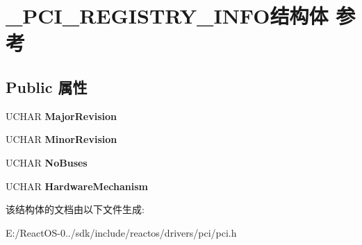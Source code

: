 \hypertarget{struct___p_c_i___r_e_g_i_s_t_r_y___i_n_f_o}{}\section{\+\_\+\+P\+C\+I\+\_\+\+R\+E\+G\+I\+S\+T\+R\+Y\+\_\+\+I\+N\+F\+O结构体 参考}
\label{struct___p_c_i___r_e_g_i_s_t_r_y___i_n_f_o}
\subsection*{Public 属性}
\begin{DoxyCompactItemize}
\item 
\mbox{\label{struct___p_c_i___r_e_g_i_s_t_r_y___i_n_f_o_a2ececee2df0491618c3eeca07a997860}} 
U\+C\+H\+AR {\bfseries Major\+Revision}
\item 
\mbox{\label{struct___p_c_i___r_e_g_i_s_t_r_y___i_n_f_o_af9ec685c2181d3d47cf8e70ab8c0648f}} 
U\+C\+H\+AR {\bfseries Minor\+Revision}
\item 
\mbox{\label{struct___p_c_i___r_e_g_i_s_t_r_y___i_n_f_o_ad782730a3d695e55a551610c88cc3596}} 
U\+C\+H\+AR {\bfseries No\+Buses}
\item 
\mbox{\label{struct___p_c_i___r_e_g_i_s_t_r_y___i_n_f_o_addea54c60e602bdc41e2d9033c85641c}} 
U\+C\+H\+AR {\bfseries Hardware\+Mechanism}
\end{DoxyCompactItemize}


该结构体的文档由以下文件生成\+:\begin{DoxyCompactItemize}
\item 
E\+:/\+React\+O\+S-\/0../sdk/include/reactos/drivers/pci/pci.\+h\end{DoxyCompactItemize}

